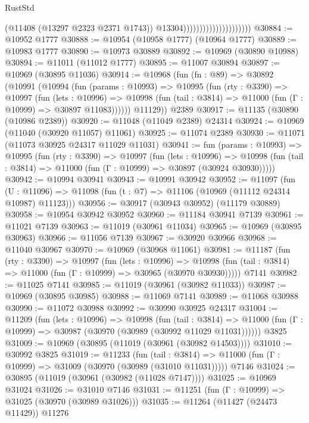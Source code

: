 \begin{lexlean}{RustStd}
\begin{coremodule}
                                              (@11408 (@13297 @2323 @2371 @1743))
                                              @13304)))))))))))))))))))))
@30884 := @10952 @1777
@30888 := @10954 (@10958 @1777) (@10964 @1777)
@30889 := @10983 @1777
@30890 := @10973 @30889
@30892 := @10969 (@30890 @10988)
@30894 := @11011 (@11012 @1777)
@30895 := @11007 @30894
@30897 := @10969 (@30895 @11036)
@30914 := @10968
    (fun (fn : @89) =>
    @30892
      (@10991
        (@10994
          (fun (params : @10993) =>
          @10995
            (fun (rty : @3390) =>
            @10997
              (fun (lets : @10996) =>
              @10998 (fun (tail : @3814) => @11000 (fun (Γ : @10999) => @30897 @11083))))))
        @11129))
    @2389
@30917 := @11135 (@30890 (@10986 @2389))
@30920 := @11048 (@11049 @2389) @24314
@30924 := @10969 (@11040 (@30920 @11057) @11061)
@30925 := @11074 @2389
@30930 := @11071 (@11073 @30925 @24317 @11029 @11031)
@30941 := fun (params : @10993) =>
  @10995
    (fun (rty : @3390) =>
    @10997
      (fun (lets : @10996) =>
      @10998 (fun (tail : @3814) => @11000 (fun (Γ : @10999) => @30897 (@30924 @30930)))))
@30942 := @10994 @30941
@30943 := @10991 @30942
@30952 := @11097
    (fun (U : @11096) => @11098 (fun (t : @7) => @11106 (@10969 (@11112 @24314 @10987) @11123)))
@30956 := @30917 (@30943 @30952) (@11179 @30889)
@30958 := @10954 @30942 @30952
@30960 := @11184 @30941 @7139
@30961 := @11021 @7139
@30963 := @11019 (@30961 @11034)
@30965 := @10969 (@30895 @30963)
@30966 := @11056 @7139
@30967 := @30920 @30966
@30968 := @11040 @30967
@30970 := @10969 (@30968 @11061)
@30981 := @11187
    (fun (rty : @3390) =>
    @10997
      (fun (lets : @10996) =>
      @10998 (fun (tail : @3814) => @11000 (fun (Γ : @10999) => @30965 (@30970 @30930)))))
    @7141
@30982 := @11025 @7141
@30985 := @11019 (@30961 (@30982 @11033))
@30987 := @10969 (@30895 @30985)
@30988 := @11069 @7141
@30989 := @11068 @30988
@30990 := @11072 @30988
@30992 := @30990 @30925 @24317
@31004 := @11209
    (fun (lets : @10996) =>
    @10998
      (fun (tail : @3814) =>
      @11000 (fun (Γ : @10999) => @30987 (@30970 (@30989 (@30992 @11029 @11031))))))
    @3825
@31009 := @10969 (@30895 (@11019 (@30961 (@30982 @14503))))
@31010 := @30992 @3825
@31019 := @11233
    (fun (tail : @3814) => @11000 (fun (Γ : @10999) => @31009 (@30970 (@30989 (@31010 @11031)))))
    @7146
@31024 := @30895 (@11019 (@30961 (@30982 (@11028 @7147))))
@31025 := @10969 @31024
@31026 := @31010 @7146
@31031 := @11251 (fun (Γ : @10999) => @31025 (@30970 (@30989 @31026)))
@31035 := @11264 (@11427 (@24473 @11429)) @11276

\end{coremodule}
\end{lexlean}
